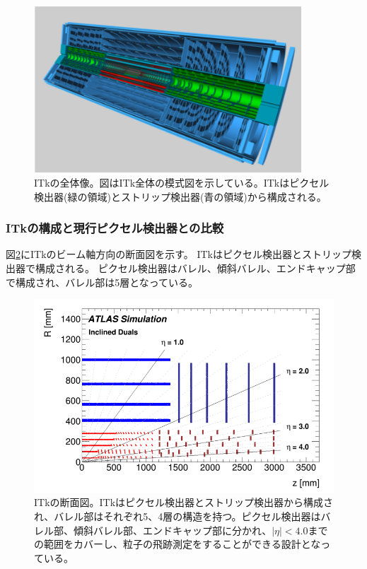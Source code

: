 \begin{figure}[bpt]\centering
\includegraphics[width=10cm]{./itk_image.png}
\caption[ITkの全体像]{ITkの全体像\cite{1-3}。図はITk全体の模式図を示している。ITkはピクセル検出器(緑の領域)とストリップ検出器(青の領域)から構成される。}
\label{itk_image}
\end{figure}

\subsubsection{ITkの構成と現行ピクセル検出器との比較}
図\ref{itk_cross_section}にITkのビーム軸方向の断面図を示す。
ITkはピクセル検出器とストリップ検出器で構成される。
ピクセル検出器はバレル、傾斜バレル、エンドキャップ部で構成され、バレル部は5層となっている。

\begin{figure}[bpt]\centering
\includegraphics[width=12cm]{./itk_cross_section.png}
\caption[ITkの断面図]{ITkの断面図\cite{1-3}。ITkはピクセル検出器とストリップ検出器から構成され、バレル部はそれぞれ5、4層の構造を持つ。ピクセル検出器はバレル部、傾斜バレル部、エンドキャップ部に分かれ、$|\eta|<4.0$までの範囲をカバーし、粒子の飛跡測定をすることができる設計となっている。}
\label{itk_cross_section}
\end{figure}

